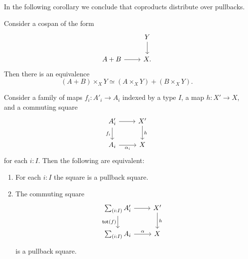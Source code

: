 In the following corollary we conclude that coproducts distribute over pullbacks. 

\begin{cor}
Consider a cospan of the form
\begin{equation*}
\begin{tikzcd}
& Y \arrow[d] \\
A+B \arrow[r] & X.
\end{tikzcd}
\end{equation*}
Then there is an equivalence
\begin{equation*}
(A+B)\times_X Y \simeq (A\times_X Y)+(B\times_X Y).
\end{equation*}
\end{cor}

\begin{thm}\label{thm:descent-Sigma}
Consider a family of maps $f_i:A'_i\to A_i$ indexed by a type $I$, a map $h:X'\to X$, and a commuting square
\begin{equation*}
\begin{tikzcd}
A'_i \arrow[r] \arrow[d,swap,"f_i"] & X' \arrow[d,"h"] \\
A_i \arrow[r,swap,"\alpha_i"] & X
\end{tikzcd}
\end{equation*}
for each $i:I$. Then the following are equivalent:
\begin{enumerate}
\item For each $i:I$ the square is a pullback square.
\item The commuting square
\begin{equation*}
\begin{tikzcd}
\sm{i:I}A'_i \arrow[d,swap,"\tot{f}"] \arrow[r] & X' \arrow[d,"h"] \\
\sm{i:I}A_i \arrow[r,"\alpha"] & X
\end{tikzcd}
\end{equation*}
is a pullback square.
\end{enumerate}
\end{thm}

